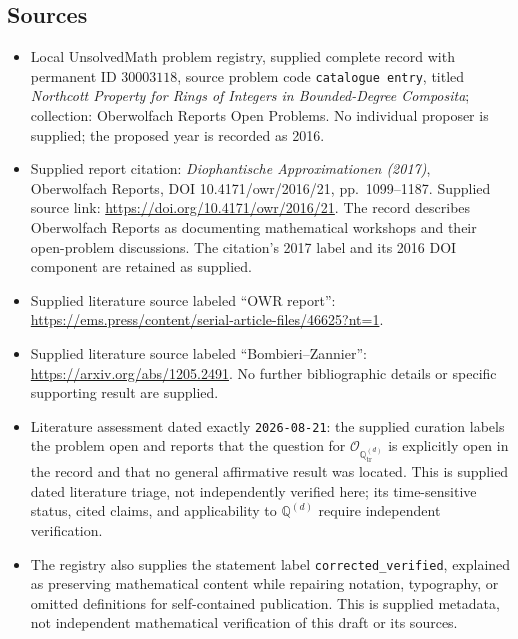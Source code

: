 \documentclass[11pt]{article}
\begin{document}
\subsection{Sources}
\begin{itemize}
\item Local UnsolvedMath problem registry, supplied complete record with permanent ID \(30003118\), source problem code \texttt{catalogue entry}, titled \emph{Northcott Property for Rings of Integers in Bounded-Degree Composita}; collection: Oberwolfach Reports Open Problems. No individual proposer is supplied; the proposed year is recorded as 2016.
\item Supplied report citation: \emph{Diophantische Approximationen (2017)}, Oberwolfach Reports, DOI 10.4171/owr/2016/21, pp.\ 1099--1187. Supplied source link: \url{https://doi.org/10.4171/owr/2016/21}. The record describes Oberwolfach Reports as documenting mathematical workshops and their open-problem discussions. The citation's 2017 label and its 2016 DOI component are retained as supplied.
\item Supplied literature source labeled ``OWR report'': \url{https://ems.press/content/serial-article-files/46625?nt=1}.
\item Supplied literature source labeled ``Bombieri--Zannier'': \url{https://arxiv.org/abs/1205.2491}. No further bibliographic details or specific supporting result are supplied.
\item Literature assessment dated exactly \texttt{2026-08-21}: the supplied curation labels the problem open and reports that the question for \(\mathcal O_{\mathbb Q_{\mathrm{tr}}^{(d)}}\) is explicitly open in the record and that no general affirmative result was located. This is supplied dated literature triage, not independently verified here; its time-sensitive status, cited claims, and applicability to \(\mathbb Q^{(d)}\) require independent verification.
\item The registry also supplies the statement label \texttt{corrected\_verified}, explained as preserving mathematical content while repairing notation, typography, or omitted definitions for self-contained publication. This is supplied metadata, not independent mathematical verification of this draft or its sources.
\end{itemize}
\end{document}
